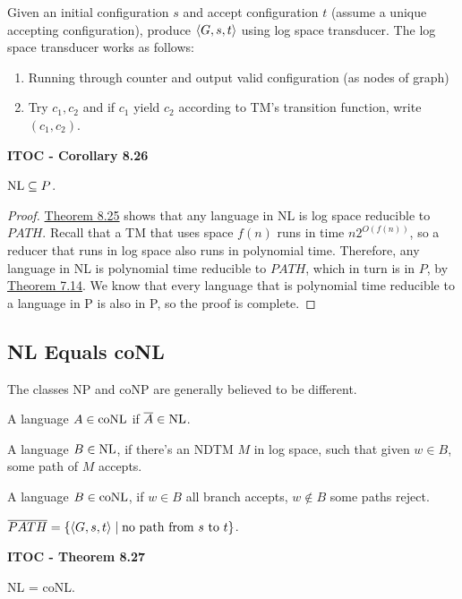 Given an initial configuration $s$ and accept configuration $t$ (assume a unique accepting configuration), produce $\langle{G, s, t}\rangle$ using log space transducer. The log space transducer works as follows:
\begin{enumerate}
\item Running through counter and output valid configuration (as nodes of graph)
\item Try $c_1, c_2$ and if $c_1$ yield $c_2$ according to TM's transition function, write $(c_1, c_2)$.
\end{enumerate}

\begin{shaded}
\textbf{ITOC - Corollary 8.26}

\medskip
$\text{NL} \subseteq P$.
\end{shaded}

\begin{mdframed}
\begin{proof}
\hyperref[theo:8.25]{Theorem 8.25} shows that any language in NL is log space reducible to $PATH$. Recall that a TM that uses space $f(n)$ runs in time $n2^{O(f(n))}$, so a reducer that runs in log space also runs in polynomial time. Therefore, any language in NL is polynomial time reducible to $PATH$, which in turn is in $P$, by \hyperref[theo:7.14]{Theorem 7.14}. We know that every language that is polynomial time reducible to a language in P is also in P, so the proof is complete.
\end{proof}
\end{mdframed}

\subsection{NL Equals coNL}

The classes NP and coNP are generally believed to be different.

A language $A \in \text{coNL}$ if $\overline{A} \in \text{NL}$.

A language $B \in \text{NL}$, if there's an NDTM $M$ in log space, such that given $w \in B$, some path of $M$ accepts.

A language $B \in \text{coNL}$, if $w \in B$ all branch accepts, $w \not \in B$ some paths reject.

$ \overline{PATH} = \{ \langle{G, s, t}\rangle \mid \text{no path from $s$ to $t$}\}$.

\label{theo:8.27}
\begin{shaded}
\textbf{ITOC - Theorem 8.27}

\medskip
NL = coNL.
\end{shaded}

